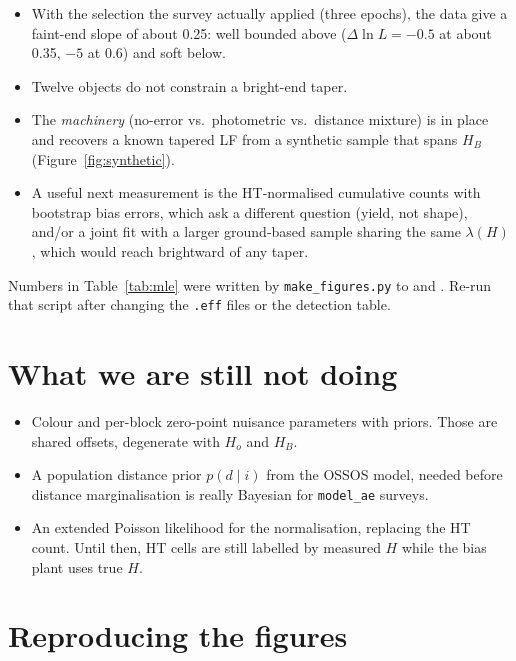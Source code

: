 \documentclass[11pt,a4paper]{article}
\begin{document}
\begin{itemize}
  \item With the selection the survey actually applied (three epochs), the
  data give a faint-end slope of about 0.25: well bounded above ($\Delta\ln L=-0.5$
  at about 0.35, $-5$ at 0.6) and soft below.
  \item Twelve objects do not constrain a bright-end taper.
  \item The \emph{machinery} (no-error vs.\ photometric vs.\ distance mixture)
  is in place and recovers a known tapered LF from a synthetic sample that
  spans $H_B$ (Figure~\ref{fig:synthetic}).
  \item A useful next measurement is the HT-normalised cumulative counts with
  bootstrap bias errors, which ask a different question (yield, not shape),
  and/or a joint fit with a larger ground-based sample sharing the same
  $\lambda(H)$, which would reach brightward of any taper.
\end{itemize}

Numbers in Table~\ref{tab:mle} were written by \texttt{make\_figures.py} to
 and .
Re-run that script after changing the \texttt{.eff} files or the detection
table.

\section{What we are still not doing}
\label{sec:future}

\begin{itemize}
  \item Colour and per-block zero-point nuisance parameters with priors.
  Those are shared offsets, degenerate with $H_o$ and $H_B$.
  \item A population distance prior $p(d\mid i)$ from the OSSOS model, needed
  before distance marginalisation is really Bayesian for \texttt{model\_ae}
  surveys.
  \item An extended Poisson likelihood for the normalisation, replacing the
  HT count.  Until then, HT cells are still labelled by measured $H$ while the
  bias plant uses true $H$.
\end{itemize}

\section{Reproducing the figures}
\label{sec:repro}
\end{document}
